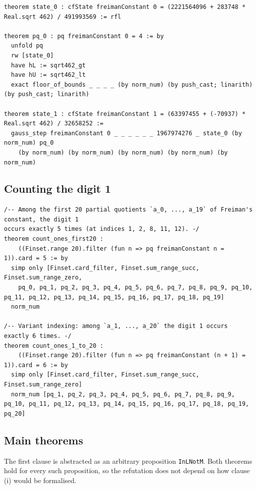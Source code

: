 \documentclass[11pt]{article}
\begin{document}
\begin{lstlisting}
theorem state_0 : cfState freimanConstant 0 = (2221564096 + 283748 * Real.sqrt 462) / 491993569 := rfl

theorem pq_0 : pq freimanConstant 0 = 4 := by
  unfold pq
  rw [state_0]
  have hL := sqrt462_gt
  have hU := sqrt462_lt
  exact floor_of_bounds _ _ _ _ (by norm_num) (by push_cast; linarith) (by push_cast; linarith)

theorem state_1 : cfState freimanConstant 1 = (63397455 + (-70937) * Real.sqrt 462) / 32658252 :=
  gauss_step freimanConstant 0 _ _ _ _ _ _ 1967974276 _ state_0 (by norm_num) pq_0
    (by norm_num) (by norm_num) (by norm_num) (by norm_num) (by norm_num)
\end{lstlisting}

\subsection{Counting the digit 1}

\begin{lstlisting}
/-- Among the first 20 partial quotients `a_0, ..., a_19` of Freiman's constant, the digit 1
occurs exactly 5 times (at indices 1, 2, 8, 11, 12). -/
theorem count_ones_first20 :
    ((Finset.range 20).filter (fun n => pq freimanConstant n = 1)).card = 5 := by
  simp only [Finset.card_filter, Finset.sum_range_succ, Finset.sum_range_zero,
    pq_0, pq_1, pq_2, pq_3, pq_4, pq_5, pq_6, pq_7, pq_8, pq_9, pq_10, pq_11, pq_12, pq_13, pq_14, pq_15, pq_16, pq_17, pq_18, pq_19]
  norm_num

/-- Variant indexing: among `a_1, ..., a_20` the digit 1 occurs exactly 6 times. -/
theorem count_ones_1_to_20 :
    ((Finset.range 20).filter (fun n => pq freimanConstant (n + 1) = 1)).card = 6 := by
  simp only [Finset.card_filter, Finset.sum_range_succ, Finset.sum_range_zero]
  norm_num [pq_1, pq_2, pq_3, pq_4, pq_5, pq_6, pq_7, pq_8, pq_9, pq_10, pq_11, pq_12, pq_13, pq_14, pq_15, pq_16, pq_17, pq_18, pq_19, pq_20]
\end{lstlisting}

\subsection{Main theorems}

The first clause is abstracted as an arbitrary proposition \texttt{InLNotM}. Both theorems hold
for every such proposition, so the refutation does not depend on how clause (i) would be formalised.
\end{document}
